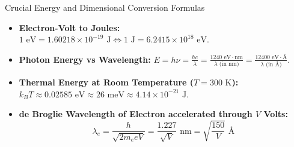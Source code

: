 \begin{formulabox}{Crucial Energy and Dimensional Conversion Formulas}
\begin{itemize}[leftmargin=*,itemsep=2pt]
    \item \textbf{Electron-Volt to Joules:} $1\text{ eV} = 1.60218 \times 10^{-19}\text{ J} \iff 1\text{ J} = 6.2415 \times 10^{18}\text{ eV}$.
    \item \textbf{Photon Energy vs Wavelength:} $E = h\nu = \frac{hc}{\lambda} = \frac{1240\text{ eV}\cdot\text{nm}}{\lambda\text{ (in nm)}} = \frac{12400\text{ eV}\cdot\text{\AA}}{\lambda\text{ (in \AA)}}$.
    \item \textbf{Thermal Energy at Room Temperature ($T = 300\text{ K}$):} $k_B T \approx 0.02585\text{ eV} \approx 26\text{ meV} \approx 4.14 \times 10^{-21}\text{ J}$.
    \item \textbf{de Broglie Wavelength of Electron accelerated through $V$ Volts:}
    \[
    \lambda_e = \frac{h}{\sqrt{2m_e e V}} = \frac{1.227}{\sqrt{V}}\text{ nm} = \sqrt{\frac{150}{V}}\text{ \AA}
    \]
\end{itemize}
\end{formulabox}
